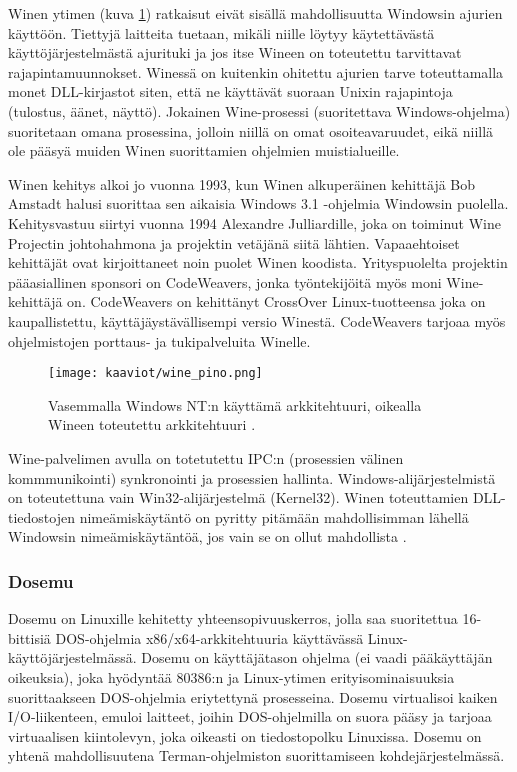 Winen ytimen (kuva \ref{wine_pino}) ratkaisut eivät sisällä mahdollisuutta Windowsin ajurien käyttöön. Tiettyjä laitteita tuetaan, mikäli niille löytyy käytettävästä käyttöjärjestelmästä ajurituki ja jos itse Wineen on toteutettu tarvittavat rajapintamuunnokset. Winessä on kuitenkin ohitettu ajurien tarve toteuttamalla monet DLL-kirjastot siten, että ne käyttävät suoraan Unixin rajapintoja (tulostus, äänet, näyttö). Jokainen Wine-prosessi (suoritettava Windows-ohjelma) suoritetaan omana prosessina, jolloin niillä on omat osoiteavaruudet, eikä niillä ole pääsyä muiden Winen suorittamien ohjelmien muistialueille.

Winen kehitys alkoi jo vuonna 1993, kun Winen alkuperäinen kehittäjä Bob Amstadt halusi suorittaa sen aikaisia Windows 3.1 -ohjelmia Windowsin puolella. Kehitysvastuu siirtyi vuonna 1994 Alexandre Julliardille, joka on toiminut Wine Projectin johtohahmona ja projektin vetäjänä siitä lähtien. Vapaaehtoiset kehittäjät ovat kirjoittaneet noin puolet Winen koodista. Yrityspuolelta projektin pääasiallinen sponsori on CodeWeavers, jonka työntekijöitä myös moni Wine-kehittäjä on. CodeWeavers on kehittänyt CrossOver Linux-tuotteensa joka on kaupallistettu, käyttäjäystävällisempi versio Winestä. CodeWeavers tarjoaa myös ohjelmistojen porttaus- ja tukipalveluita Winelle\cite{wine:codeweavers}.


\begin{figure}[H]
\centering
\texttt{[image: kaaviot/wine\_pino.png]}
\caption{Vasemmalla Windows NT:n käyttämä arkkitehtuuri, oikealla Wineen toteutettu arkkitehtuuri \cite{wine:winnt_architecture,wine:architecture}.}
\label{wine_pino}
\end{figure}

Wine-palvelimen avulla on totetutettu IPC:n (prosessien välinen kommmunikointi) synkronointi ja prosessien hallinta. Windows-alijärjestelmistä on toteutettuna vain Win32-alijärjestelmä (Kernel32). Winen toteuttamien DLL-tiedostojen nimeämiskäytäntö on pyritty pitämään mahdollisimman lähellä Windowsin nimeämiskäytäntöä, jos vain se on ollut mahdollista \cite{wine:architecture}.

\subsubsection{Dosemu}

Dosemu on Linuxille kehitetty yhteensopivuuskerros, jolla saa suoritettua 16-bittisiä DOS-ohjelmia x86/x64-arkkitehtuuria käyttävässä Linux-käyttöjärjestelmässä. Dosemu on käyttäjätason ohjelma (ei vaadi pääkäyttäjän oikeuksia), joka hyödyntää 80386:n ja Linux-ytimen erityisominaisuuksia suorittaakseen DOS-ohjelmia eriytettynä prosesseina. Dosemu virtualisoi kaiken I/O-liikenteen, emuloi laitteet, joihin DOS-ohjelmilla on suora pääsy ja tarjoaa virtuaalisen kiintolevyn, joka oikeasti on tiedostopolku Linuxissa. Dosemu on yhtenä mahdollisuutena Terman-ohjelmiston suorittamiseen kohdejärjestelmässä.

